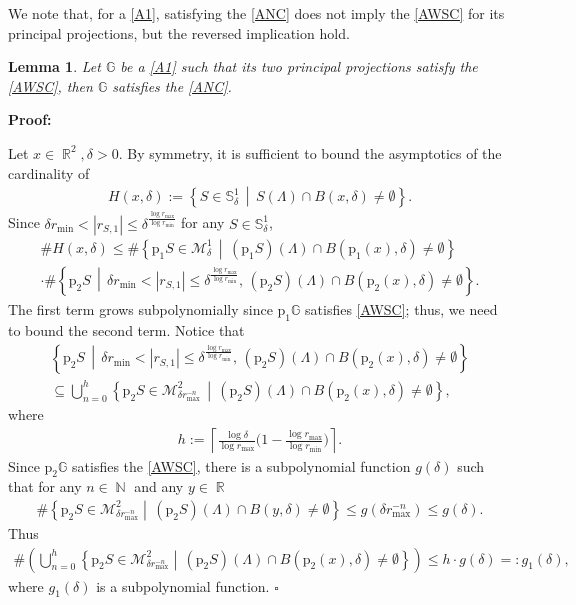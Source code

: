 \documentclass[a4paper, 11pt]{article}
\newenvironment{Proof}{\noindent \textbf{Proof:}}{\hfill$\square$\\}
\DeclareMathOperator{\N}{\mathbb{N}}
\DeclareMathOperator{\R}{\mathbb{R}}
\numberwithin{equation}{section}
\theoremstyle{plain}
\newtheorem{lemma}[theorem]{Lemma}
\theoremstyle{remark}
\theoremstyle{definition}
\begin{document}
We note that, for a \ref{A1}, satisfying the \ref{ANC} does not imply the \ref{AWSC} for its principal projections, but the reversed implication hold. 
\begin{lemma}
Let $\mathbb{G}$ be a \ref{A1} such that its two principal projections satisfy the \ref{AWSC}, then $\mathbb{G}$ satisfies the \ref{ANC}.
\end{lemma}
\begin{Proof}

Let $x \in \R^2, \delta > 0$. By symmetry, it is sufficient to bound the asymptotics of the cardinality of 
\begin{align*}
H(x,\delta) := \left\{S \in \mathbb{S}_\delta^1 \, \middle|\, S(\Lambda) \cap B(x,\delta) \neq \emptyset \right\}.
\end{align*}
Since $\delta r_{\min} < |r_{S,1}|\leq \delta^{\frac{\log r_{\max}}{\log r_{\min}}}$ for any $S\in\mathbb{S}_\delta^1$,
\begin{multline*}
\#H(x,\delta) \leq \#\left\{\mathrm{p}_1S \in \mathcal{M}_\delta^1 \, \middle|\, (\mathrm{p}_1S)(\Lambda) \cap B(\mathrm{p}_1(x),\delta) \neq \emptyset \right\} \\ \cdot \#\left\{\mathrm{p}_2S \, \middle|\, \delta r_{\min} < |r_{S,1}|\leq \delta^{\frac{\log r_{\max}}{\log r_{\min}}} , \, (\mathrm{p}_2S)(\Lambda) \cap B(\mathrm{p}_2(x),\delta) \neq \emptyset\right\}.
\end{multline*}
The first term grows subpolynomially since $\mathrm{p}_1\mathbb{G}$ satisfies \ref{AWSC}; thus, we need to bound the second term. Notice that
\begin{multline*}
\left\{\mathrm{p}_2S \, \middle|\, \delta r_{\min} < |r_{S,1}|\leq \delta^{\frac{\log r_{\max}}{\log r_{\min}}} , \, (\mathrm{p}_2S)(\Lambda) \cap B(\mathrm{p}_2(x),\delta) \neq \emptyset\right\} \\ \subseteq \bigcup_{n=0}^h \left\{\mathrm{p}_2S \in \mathcal{M}_{\delta r_{\max}^{-n}}^2 \, \middle|\, (\mathrm{p}_2S)(\Lambda) \cap B(\mathrm{p}_2(x),\delta) \neq \emptyset\right\},
\end{multline*}
where 
\begin{align*}
h := \left\lceil \frac{\log \delta}{\log r_{\max}}\Big(1-\frac{\log r_{\max}}{\log r_{\min}}\Big)\right\rceil.
\end{align*}
Since $\mathrm{p}_2\mathbb{G}$ satisfies the \ref{AWSC}, there is a subpolynomial function $g(\delta)$ such that for any $n \in \N$ and any $y \in \R$
\begin{align*}
\#\left\{\mathrm{p}_2S \in \mathcal{M}_{\delta r_{\max}^{-n}}^2 \middle|\, (\mathrm{p}_2S)(\Lambda) \cap B(y,\delta) \neq \emptyset\right\} \leq g(\delta r_{\max}^{-n}) \leq g(\delta).
\end{align*}
Thus
\begin{align*}
\# \left(\bigcup_{n=0}^h \left\{\mathrm{p}_2S \in \mathcal{M}_{\delta r_{\max}^{-n}}^2 \middle|\, (\mathrm{p}_2S)(\Lambda) \cap B(\mathrm{p}_2(x),\delta) \neq \emptyset\right\} \right) \leq h \cdot g(\delta) =: g_1(\delta),
\end{align*}
where $g_1(\delta)$ is a subpolynomial function.
\end{Proof}
\end{document}
